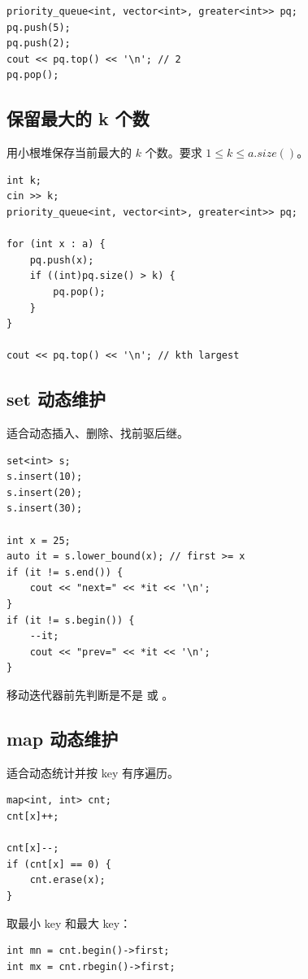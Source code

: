 \begin{lstlisting}
priority_queue<int, vector<int>, greater<int>> pq;
pq.push(5);
pq.push(2);
cout << pq.top() << '\n'; // 2
pq.pop();
\end{lstlisting}

\subsection{保留最大的 k 个数}

用小根堆保存当前最大的 $k$ 个数。要求 $1\le k\le a.size()$。

\begin{lstlisting}
int k;
cin >> k;
priority_queue<int, vector<int>, greater<int>> pq;

for (int x : a) {
    pq.push(x);
    if ((int)pq.size() > k) {
        pq.pop();
    }
}

cout << pq.top() << '\n'; // kth largest
\end{lstlisting}

\subsection{set 动态维护}

 适合动态插入、删除、找前驱后继。

\begin{lstlisting}
set<int> s;
s.insert(10);
s.insert(20);
s.insert(30);

int x = 25;
auto it = s.lower_bound(x); // first >= x
if (it != s.end()) {
    cout << "next=" << *it << '\n';
}
if (it != s.begin()) {
    --it;
    cout << "prev=" << *it << '\n';
}
\end{lstlisting}

移动迭代器前先判断是不是  或 。

\subsection{map 动态维护}

 适合动态统计并按 key 有序遍历。

\begin{lstlisting}
map<int, int> cnt;
cnt[x]++;

cnt[x]--;
if (cnt[x] == 0) {
    cnt.erase(x);
}
\end{lstlisting}

取最小 key 和最大 key：

\begin{lstlisting}
int mn = cnt.begin()->first;
int mx = cnt.rbegin()->first;
\end{lstlisting}

